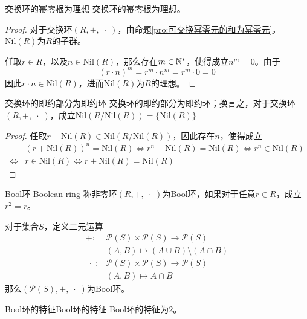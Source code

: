 \begin{proposition}{}{交换环的幂零根为理想}
	交换环的幂零根为理想。
\end{proposition}

\begin{proof}
	对于交换环$(R,+,\;\cdot\;)$，由命题\ref{pro:可交换幂零元的和为幂零元}，$\mathrm{Nil}(R)$为$R$的子群。
	
	任取$r\in R$，以及$n\in\mathrm{Nil}(R)$，那么存在$m\in \mathbb{N}^*$，使得成立$n^m=0$。由于
	$$
	(r\cdot n)^m=r^m\cdot n^m=r^m\cdot 0=0
	$$
	因此$r\cdot n\in\mathrm{Nil}(R)$，进而$\mathrm{Nil}(R)$为$R$的理想。
\end{proof}

\begin{proposition}{交换环的即约部分为即约环}
	交换环的即约部分为即约环；换言之，对于交换环$(R,+,\;\cdot \;)$，成立$\mathrm{Nil}(R/\mathrm{Nil}(R))=\{ \mathrm{Nil}(R) \}$
\end{proposition}

\begin{proof}
	任取$r+\mathrm{Nil}(R)\in \mathrm{Nil}(R/\mathrm{Nil}(R))$，因此存在$n$​，使得成立
	\begin{align*}
		&(r+\mathrm{Nil}(R))^n=\mathrm{Nil}(R)
		\iff r^n+\mathrm{Nil}(R)=\mathrm{Nil}(R)
		\iff r^n\in \mathrm{Nil}(R)\\
		\iff & r\in\mathrm{Nil}(R)
		\iff r+\mathrm{Nil}(R)=\mathrm{Nil}(R)
	\end{align*}
\end{proof}

\begin{definition}{Bool环 Boolean ring}
	称非零环$(R,+,\;\cdot \;)$为Bool环，如果对于任意$r\in R$，成立$r^2=r$。
\end{definition}

\begin{problem}
	对于集合$S$，定义二元运算
	\begin{align*}
		+:&\mathscr{P}(S)\times \mathscr{P}(S)\to \mathscr{P}(S)\\
		&(A,B)\mapsto (A\cup B)\setminus(A\cap B)\\
		\;\cdot\;:&\mathscr{P}(S)\times \mathscr{P}(S)\to \mathscr{P}(S)\\
		&(A,B)\mapsto A\cap B
	\end{align*}
	那么$(\mathscr{P}(S),+,\;\cdot\;)$为Bool环。
\end{problem}

\begin{proposition}{Bool环的特征}{Bool环的特征}
	Bool环的特征为$2$。
\end{proposition}

